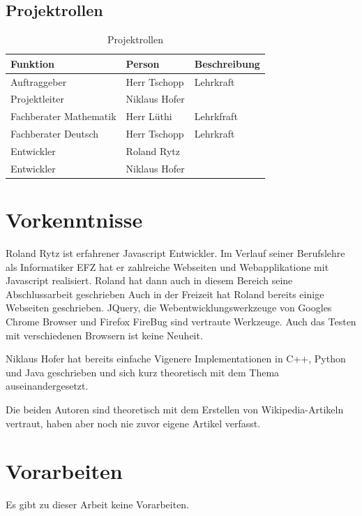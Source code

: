\documentclass[11pt,paper=a4,final]{scrartcl}
\begin{document}
\subsection{Projektrollen}
\begin{table}[h!]
  \centering
  \begin{tabular}{|l|l|l|}
    \hline
    \bf Funktion & \bf Person & \bf Beschreibung \\ \hline
    Auftraggeber & Herr Tschopp & Lehrkraft \\ \hline
    Projektleiter & Niklaus Hofer & \\ \hline
    Fachberater Mathematik & Herr L\"uthi & Lehrkfraft \\ \hline
    Fachberater Deutsch & Herr Tschopp & Lehrkraft \\ \hline
    Entwickler & Roland Rytz & \\ \hline
    Entwickler & Niklaus Hofer & \\ \hline
  \end{tabular}
  \caption{Projektrollen}
\end{table}
\section{Vorkenntnisse}
Roland Rytz ist erfahrener Javascript Entwickler. Im Verlauf seiner Berufslehre
als Informatiker EFZ hat er zahlreiche Webseiten und Webapplikatione mit
Javascript realisiert. Roland hat dann auch in diesem Bereich seine
Abschlussarbeit geschrieben Auch in der Freizeit hat Roland bereits einige
Webseiten geschrieben. JQuery, die Webentwicklungswerkzeuge von Googles Chrome
Browser und Firefox FireBug sind vertraute Werkzeuge. Auch das Testen mit
verschiedenen Browsern ist keine Neuheit.

Niklaus Hofer hat bereits einfache Vigenere Implementationen in C++, Python und
Java geschrieben und sich kurz theoretisch mit dem Thema auseinandergesetzt.

Die beiden Autoren sind theoretisch mit dem Erstellen von Wikipedia-Artikeln
vertraut, haben aber noch nie zuvor eigene Artikel verfasst.
\section{Vorarbeiten}
Es gibt zu dieser Arbeit keine Vorarbeiten.
\end{document}
